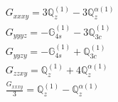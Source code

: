 \documentclass[fleqn,8pt,landscape]{jsarticle}
\begin{document}
\begin{align*}
& G_{xxxy} = 3 \mathbb{Q}_{z}^{(1)} - 3 \mathbb{Q}_{z}^{\alpha(1)} \\
& G_{yyyz} = - \mathbb{G}_{4s}^{(1)} - 3 \mathbb{Q}_{3c}^{(1)} \\
& G_{yyzy} = - \mathbb{G}_{4s}^{(1)} + \mathbb{Q}_{3c}^{(1)} \\
& G_{zzxy} = \mathbb{Q}_{z}^{(1)} + 4 \mathbb{Q}_{z}^{\alpha(1)} \\
& \frac{G_{xxxy}}{3} = \mathbb{Q}_{z}^{(1)} - \mathbb{Q}_{z}^{\alpha(1)}
\end{align*}
\end{document}
